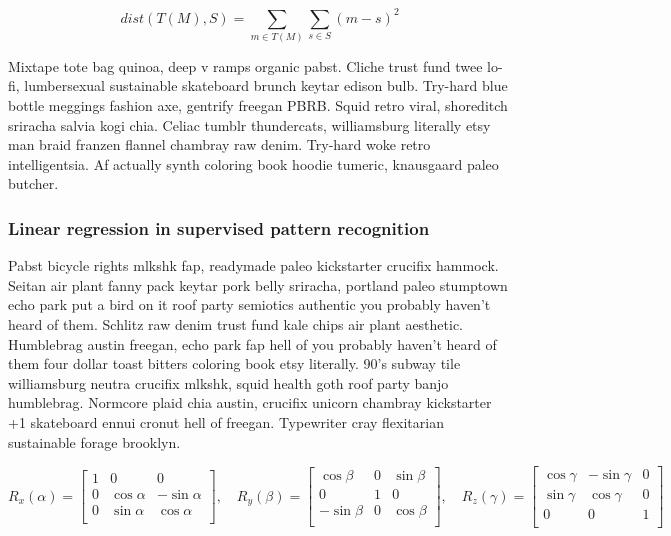 \documentclass[a4paper]{article}
\begin{document}
\begin{equation}
{ dist }(T({ M }),{ S })=\sum _{ m\in T({ M }) } \sum _{ s\in { S } } (m-s)^{ 2 }
\end{equation}

Mixtape tote bag quinoa, deep v ramps organic pabst. Cliche trust fund twee lo-fi, lumbersexual sustainable skateboard brunch keytar edison bulb. Try-hard blue bottle meggings fashion axe, gentrify freegan PBRB. Squid retro viral, shoreditch sriracha salvia kogi chia. Celiac tumblr thundercats, williamsburg literally etsy man braid franzen flannel chambray raw denim. Try-hard woke retro intelligentsia. Af actually synth coloring book hoodie tumeric, knausgaard paleo butcher.

\subsubsection{Linear regression in supervised pattern recognition}
\label{subsubsec:linearregression}

Pabst bicycle rights mlkshk fap, readymade paleo kickstarter crucifix hammock. Seitan air plant fanny pack keytar pork belly sriracha, portland paleo stumptown echo park put a bird on it roof party semiotics authentic you probably haven't heard of them. Schlitz raw denim trust fund kale chips air plant aesthetic. Humblebrag austin freegan, echo park fap hell of you probably haven't heard of them four dollar toast bitters coloring book etsy literally. 90's subway tile williamsburg neutra crucifix mlkshk, squid health goth roof party banjo humblebrag. Normcore plaid chia austin, crucifix unicorn chambray kickstarter +1 skateboard ennui cronut hell of freegan. Typewriter cray flexitarian sustainable forage brooklyn.

\begin{equation}
R_x(\alpha) = \begin{bmatrix}
1 & 0 & 0 \\
0 & \cos \alpha &  -\sin \alpha \\[3pt]
0 & \sin \alpha  &  \cos \alpha \\[3pt]
\end{bmatrix}, \quad
R_y(\beta) = \begin{bmatrix}
\cos \beta & 0 & \sin \beta \\[3pt]
0 & 1 & 0 \\[3pt]
-\sin \beta & 0 & \cos \beta \\
\end{bmatrix}, \quad
R_z(\gamma) = \begin{bmatrix}
\cos \gamma &  -\sin \gamma & 0 \\[3pt]
\sin \gamma & \cos \gamma & 0\\[3pt]
0 & 0 & 1\\
\end{bmatrix}
\end{equation}
\end{document}
